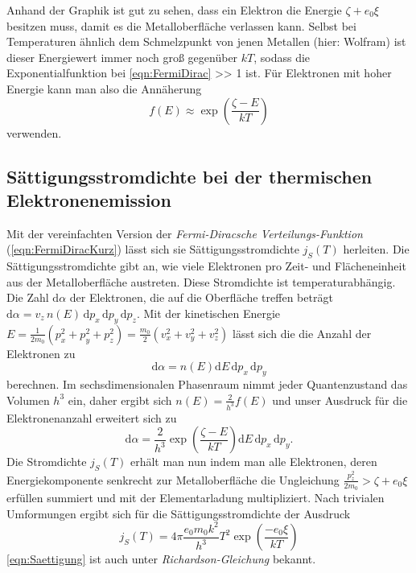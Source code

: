 Anhand der Graphik ist gut zu sehen, dass ein Elektron die Energie $\zeta + e_0 \xi$
besitzen muss, damit es die Metalloberfläche verlassen kann. Selbst bei Temperaturen
ähnlich dem Schmelzpunkt von jenen Metallen (hier: Wolfram) ist dieser Energiewert
immer noch groß gegenüber $kT$, sodass die Exponentialfunktion bei \autoref{eqn:FermiDirac}
>> 1 ist. Für Elektronen mit hoher Energie kann man also die
Annäherung 
\begin{equation}
    \label{eqn:FermiDiracKurz}
    f(E) \approx \exp{\left(\frac{\zeta - E}{kT}\right)}
\end{equation}
verwenden.

\subsection{Sättigungsstromdichte bei der thermischen Elektronenemission}

Mit der vereinfachten Version der \textit{Fermi-Diracsche Verteilungs-Funktion} 
(\autoref{eqn:FermiDiracKurz}) lässt sich sie Sättigungsstromdichte $j_S(T)$ herleiten.
Die Sättigungsstromdichte gibt an, wie viele Elektronen pro Zeit- und Flächeneinheit 
aus der Metalloberfläche austreten. Diese Stromdichte ist temperaturabhängig. Die Zahl
$\mathrm{d}\alpha$  der Elektronen, die auf die Oberfläche treffen beträgt $\mathrm{d}\alpha=v_z \, n(E) \, \mathrm{d}p_x \,
\mathrm{d}p_y \, \mathrm{d}p_z$. Mit der kinetischen Energie $ E = \frac{1}{2 m_0} \left(p_x^2 + p_y^2 +p_z^2\right) = 
\frac{m_0}{2}\left(v_x^2 + v_y^2 + v_z^2\right)$ lässt sich die die Anzahl der Elektronen
zu 
\begin{equation*}
    \mathrm{d}\alpha = n(E) \mathrm{d}E \, \mathrm{d}p_x \, \mathrm{d}p_y
\end{equation*}
berechnen. Im sechsdimensionalen Phasenraum nimmt jeder Quantenzustand das Volumen $h^3$ 
ein, daher ergibt sich $n(E) = \frac{2}{h^3} f(E)$ und unser Ausdruck für die 
Elektronenanzahl erweitert sich zu 
\begin{equation*}
    \mathrm{d}\alpha = \frac{2}{h^3} \exp{\left(\frac{\zeta - E}{kT}\right)} \mathrm{d}E \, \mathrm{d}p_x \, \mathrm{d}p_y.
\end{equation*}
Die Stromdichte $j_S(T)$ erhält man nun indem man alle Elektronen, deren Energiekomponente senkrecht zur Metalloberfläche die Ungleichung
$ \frac{p_z^2}{2m_0} > \zeta + e_0 \xi$ erfüllen summiert und mit der Elementarladung multipliziert.
Nach trivialen Umformungen ergibt sich für die Sättigungsstromdichte der Ausdruck
\begin{equation}
    \label{eqn:Saettigung}
    j_S(T) = 4\pi \frac{e_0 m_0 k^2}{h^3} T^2 \exp{\left(\frac{-e_0 \xi}{kT}\right)}
\end{equation}
\autoref{eqn:Saettigung} ist auch unter \textit{Richardson-Gleichung} bekannt.

